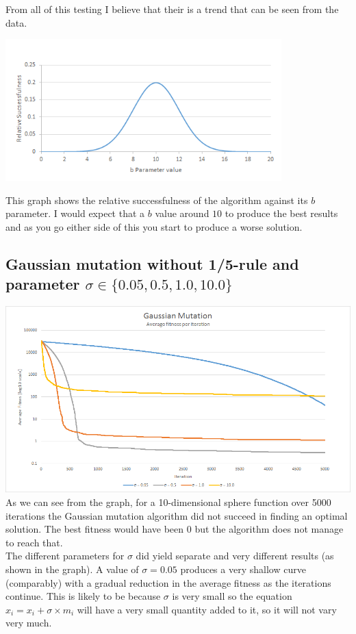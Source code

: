 \documentclass{article}
\begin{document}
	From all of this testing I believe that their is a trend that can be seen from the data. \\
	\begin{center}
	\includegraphics[width=0.8\textwidth]{Images/NonUniformMutationBellCurve}
	\end{center}
	This graph shows the relative successfulness of the algorithm against its $b$ parameter. I would expect that a $b$ value around $10$ to produce the best results and as you go either side of this you start to produce a worse solution.
	
	\subsection{Gaussian mutation without 1/5-rule and parameter $\sigma \in \{0.05, 0.5, 1.0, 10.0\}$}
	\includegraphics[width=1\textwidth]{Images/GaussianMutation}\\
	
    As we can see from the graph, for a 10-dimensional sphere function over 5000 iterations the Gaussian mutation algorithm did not succeed in finding an optimal solution. The best fitness would have been $0$ but the algorithm does not manage to reach that.\\
	
	The different parameters for $\sigma$ did yield separate and very different results (as shown in the graph). A value of $\sigma=0.05$ produces a very shallow curve (comparably) with a gradual reduction in the average fitness as the iterations continue. This is likely to be because $\sigma$ is very small so the equation $x_i = x_i + \sigma \times m_i$ will have a very small quantity added to it, so it will not vary very much.\\
	
\end{document}
